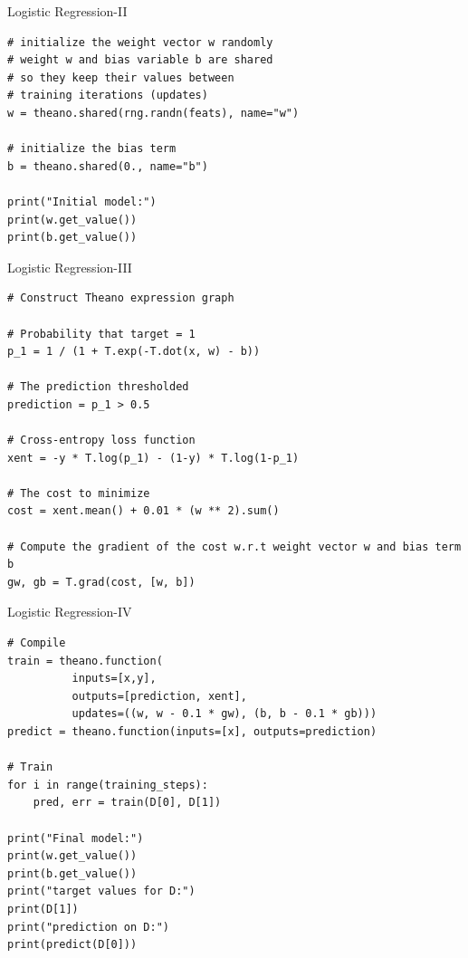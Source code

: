 \documentclass[a4paper,9pt]{beamer}
\begin{document}
\begin{frame}[fragile]{Logistic Regression-II}
\begin{verbatim}
# initialize the weight vector w randomly
# weight w and bias variable b are shared 
# so they keep their values between 
# training iterations (updates)
w = theano.shared(rng.randn(feats), name="w")

# initialize the bias term
b = theano.shared(0., name="b")

print("Initial model:")
print(w.get_value())
print(b.get_value())

\end{verbatim}
\end{frame}


\begin{frame}[fragile]{Logistic Regression-III}
\begin{verbatim}
# Construct Theano expression graph

# Probability that target = 1
p_1 = 1 / (1 + T.exp(-T.dot(x, w) - b))

# The prediction thresholded
prediction = p_1 > 0.5

# Cross-entropy loss function
xent = -y * T.log(p_1) - (1-y) * T.log(1-p_1)

# The cost to minimize
cost = xent.mean() + 0.01 * (w ** 2).sum()

# Compute the gradient of the cost w.r.t weight vector w and bias term b
gw, gb = T.grad(cost, [w, b])             
\end{verbatim}
\end{frame}


\begin{frame}[fragile]{Logistic Regression-IV}
\begin{verbatim}
# Compile
train = theano.function(
          inputs=[x,y],
          outputs=[prediction, xent],
          updates=((w, w - 0.1 * gw), (b, b - 0.1 * gb)))
predict = theano.function(inputs=[x], outputs=prediction)

# Train
for i in range(training_steps):
    pred, err = train(D[0], D[1])

print("Final model:")
print(w.get_value())
print(b.get_value())
print("target values for D:")
print(D[1])
print("prediction on D:")
print(predict(D[0]))
\end{verbatim}
\end{frame}


\section{}
\end{document}
